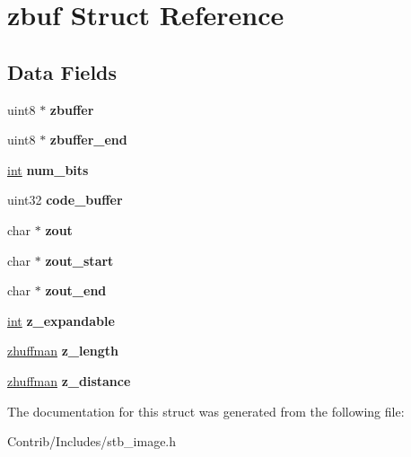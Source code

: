 \hypertarget{structzbuf}{}\section{zbuf Struct Reference}
\label{structzbuf}
\subsection*{Data Fields}
\begin{DoxyCompactItemize}
\item 
uint8 $\ast$ {\bfseries zbuffer}\hypertarget{structzbuf_ad293887088554556b05337c4eefa5eec}{}\label{structzbuf_ad293887088554556b05337c4eefa5eec}

\item 
uint8 $\ast$ {\bfseries zbuffer\+\_\+end}\hypertarget{structzbuf_a25965fbf2e8fc71f729e1c9e3592eb43}{}\label{structzbuf_a25965fbf2e8fc71f729e1c9e3592eb43}

\item 
\hyperlink{_s_d_l__thread_8h_a6a64f9be4433e4de6e2f2f548cf3c08e}{int} {\bfseries num\+\_\+bits}\hypertarget{structzbuf_a3248b66d0aee4e118d186124a596f522}{}\label{structzbuf_a3248b66d0aee4e118d186124a596f522}

\item 
uint32 {\bfseries code\+\_\+buffer}\hypertarget{structzbuf_a3c38af98586cc9ac2e0156ca03899caf}{}\label{structzbuf_a3c38af98586cc9ac2e0156ca03899caf}

\item 
char $\ast$ {\bfseries zout}\hypertarget{structzbuf_a651db2b663f79ccffc192e8f7e5c7aa1}{}\label{structzbuf_a651db2b663f79ccffc192e8f7e5c7aa1}

\item 
char $\ast$ {\bfseries zout\+\_\+start}\hypertarget{structzbuf_aac129cd508c021be4de47be5eb4d7d37}{}\label{structzbuf_aac129cd508c021be4de47be5eb4d7d37}

\item 
char $\ast$ {\bfseries zout\+\_\+end}\hypertarget{structzbuf_adc84a1718d2a9085882ac31d4b924f29}{}\label{structzbuf_adc84a1718d2a9085882ac31d4b924f29}

\item 
\hyperlink{_s_d_l__thread_8h_a6a64f9be4433e4de6e2f2f548cf3c08e}{int} {\bfseries z\+\_\+expandable}\hypertarget{structzbuf_a2b95d7acacf3765a611a3706fe6e696f}{}\label{structzbuf_a2b95d7acacf3765a611a3706fe6e696f}

\item 
\hyperlink{structzhuffman}{zhuffman} {\bfseries z\+\_\+length}\hypertarget{structzbuf_adb2bd339fcff6851bd5db0ba47216164}{}\label{structzbuf_adb2bd339fcff6851bd5db0ba47216164}

\item 
\hyperlink{structzhuffman}{zhuffman} {\bfseries z\+\_\+distance}\hypertarget{structzbuf_abed6e138a01d515c9bef22883b5b6001}{}\label{structzbuf_abed6e138a01d515c9bef22883b5b6001}

\end{DoxyCompactItemize}


The documentation for this struct was generated from the following file\+:\begin{DoxyCompactItemize}
\item 
Contrib/\+Includes/stb\+\_\+image.\+h\end{DoxyCompactItemize}
